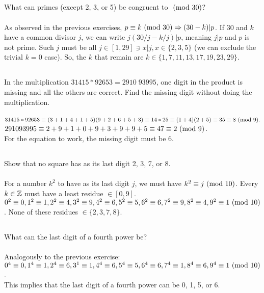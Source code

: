 \documentclass{article}
\begin{document}
\subsection{}
What can primes (except 2, 3, or 5) be congruent to $\ (\mathrm{mod}\ 30)$?\\~\\
As observed in the previous exercises, $p \equiv k \ (\mathrm{mod}\ 30) \Rightarrow (30 - k)|p$.
If 30 and $k$ have a common divisor $j$, we can write $j(30/j - k/j)|p$,
meaning $j|p$ and $p$ is not prime.
Such $j$ must be all $j \in [1, 29] \ni x|j, x \in \{2, 3, 5\}$
(we can exclude the trivial $k = 0$ case).
So, the $k$ that remain are $k \in \{1, 7, 11, 13, 17, 19, 23, 29\}$.

\subsection{}
In the multiplication $31415 * 92653 = 2910\;93995$, one digit in the product is
missing and all the others are correct.
Find the missing digit without doing the multiplication.\\~\\
$31415 * 92653 \equiv (3 + 1 + 4 + 1 + 5)(9 + 2 + 6 + 5 + 3)
\equiv 14 * 25 \equiv (1 + 4)(2 + 5) \equiv 35 \equiv 8 \ (\mathrm{mod}\ 9).$\\
$291093995 \equiv 2 + 9 + 1 + 0 + 9 + 3 + 9 + 9 + 5 \equiv 47 \equiv 2 \ (\mathrm{mod}\ 9)$.\\
For the equation to work, the missing digit must be 6.

\subsection{}
Show that no square has as its last digit 2, 3, 7, or 8.\\~\\
For a number $k^2$ to have as its last digit $j$, we must have $k^2 \equiv j \ (\mathrm{mod}\ 10)$.
Every $k \in \mathbb{Z}$ must have a least residue $\in [0, 9]$.
$0^2 \equiv 0, 1^2 \equiv 1, 2^2 \equiv 4, 3^2 \equiv 9, 4^2 \equiv 6, 5^2 \equiv 5,
6^2 \equiv 6, 7^2 \equiv 9, 8^2 \equiv 4, 9^2 \equiv 1 \ (\mathrm{mod}\ 10)$.
None of these residues $\in \{2, 3, 7, 8\}$.

\subsection{}
What can the last digit of a fourth power be?\\~\\
Analogously to the previous exercise:\\
$0^4 \equiv 0, 1^4 \equiv 1, 2^4 \equiv 6, 3^1 \equiv 1, 4^4 \equiv 6, 5^4 \equiv 5,
6^4 \equiv 6, 7^4 \equiv 1, 8^4 \equiv 6, 9^4 \equiv 1 \ (\mathrm{mod}\ 10)$.\\
This implies that the last digit of a fourth power can be 0, 1, 5, or 6.
\end{document}
